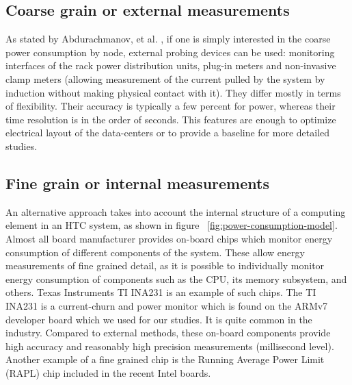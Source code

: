 \subsection*{Coarse grain or external measurements}
As stated by Abdurachmanov, et al. \cite{ACAT}, if one is simply interested in the coarse power consumption by node,
external probing devices can be used: monitoring interfaces
of the rack power distribution units, plug-in meters and non-invasive
clamp meters (allowing measurement of the
current pulled by the system by induction without making physical
contact with it). They differ mostly in terms of flexibility.
Their accuracy is typically a few percent for power, whereas their time
resolution is in the order of seconds. This features are enough
to optimize electrical layout of the data-centers or to provide a
baseline for more detailed studies.

\subsection*{Fine grain or internal measurements}
An alternative approach takes into account the internal structure of a
computing element in an HTC system, as shown in figure 
~\ref{fig:power-consumption-model}. Almost all board manufacturer
provides on-board chips which monitor energy consumption of
different components of the system. These
allow energy measurements of fine grained detail, as it is possible
to individually monitor energy consumption of components such as
the CPU, its memory subsystem, and others. Texas Instruments TI INA231 is an
example of such chips\cite{TIINA231}. The TI INA231 is a current-churn
and power monitor which is found on the ARMv7 developer board which
we used for our studies. It is quite common in the industry.
Compared to external methods, these on-board components provide
high accuracy and reasonably high precision measurements (millisecond
level). Another example of a fine grained chip is the Running Average Power
Limit (RAPL) chip included in the recent Intel boards.

